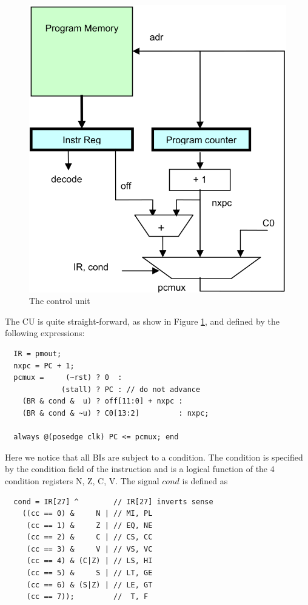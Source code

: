 \begin{figure}[h!]
  \centering
  \includegraphics[width=.9\textwidth]{i/7.png}
  \caption{The control unit}
  \label{fig:cu}
\end{figure}
The CU is quite straight-forward, as show in Figure \ref{fig:cu}, and defined by the following
expressions:
\begin{verbatim}
  IR = pmout;
  nxpc = PC + 1;
  pcmux =     (~rst) ? 0  :
             (stall) ? PC : // do not advance
    (BR & cond &  u) ? off[11:0] + nxpc :
    (BR & cond & ~u) ? C0[13:2]         : nxpc;
 
  always @(posedge clk) PC <= pcmux; end
\end{verbatim}

Here we notice that all BIs are subject to a condition. The condition is specified by the condition
field of the instruction and is a logical function of the 4 condition registers N, Z, C, V. The
signal $cond$ is defined as
\begin{verbatim}
  cond = IR[27] ^        // IR[27] inverts sense
    ((cc == 0) &     N | // MI, PL
     (cc == 1) &     Z | // EQ, NE
     (cc == 2) &     C | // CS, CC
     (cc == 3) &     V | // VS, VC
     (cc == 4) & (C|Z) | // LS, HI
     (cc == 5) &     S | // LT, GE
     (cc == 6) & (S|Z) | // LE, GT
     (cc == 7));         //  T, F
\end{verbatim}

